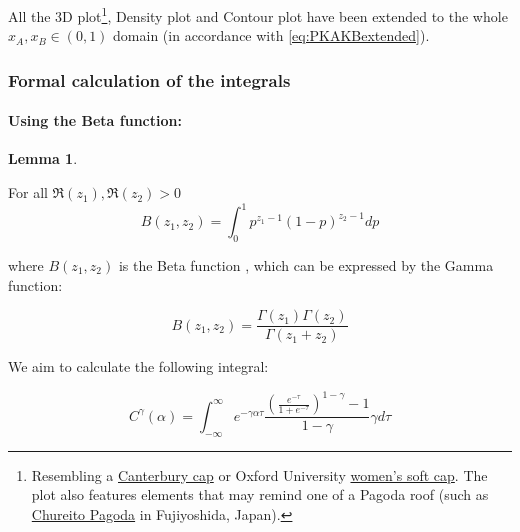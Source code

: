 \documentclass{article}
\theoremstyle{definition}
\newtheorem{lemma}{Lemma}[section]
\begin{document}
All the 3D plot\footnote{Resembling a \href{https://www.wippell.co.uk/Online-Shop/Clergy-Outffiting/Hats-\%281\%29/Style-250-Canterbury-Cap.aspx}{Canterbury cap} or Oxford University \href{https://www.museodelestudiante.com/Indumentaria_y_distintivos/SoftCapAA.htm}{women's soft cap}. The plot also features elements that may remind one of a Pagoda roof \cite{book:BuddhistArchitecture,book:JapaneseArchitecture} (such as \href{https://en.wikipedia.org/wiki/File:Chureito_Pagoda_and_Mount_Fuji.jpg}{Chureito Pagoda} in Fujiyoshida, Japan).}, Density plot and Contour plot have been extended to the whole $x_A,x_B \in (0,1)$ domain (in accordance with \eqref{eq:PKAKBextended}).


\subsubsection{Formal calculation of the integrals}
\label{sec:gammaGammaIntegrals}

\paragraph{Using the Beta function:}

\begin{lemma}
\label{lemma:BetaDef}

For all $\Re(z_1),\Re(z_2) > 0$
    \begin{equation}
        B(z_1,z_2) = \int_0^1 p^{z_1-1} (1-p)^{z_2-1} dp
    \end{equation}

    where $B(z_1,z_2)$ is the Beta function \cite{book:HigherTranscendentalFunctions, book:SeymourMathematicalHandbook, book:Bronshtein, book:NISThandbook, book:Abramowitz}, which can be expressed by the Gamma function:

    \begin{equation}
        B(z_1,z_2) = \frac{\Gamma(z_1) \Gamma(z_2)}{\Gamma(z_1+z_2)}
    \end{equation}
    
\end{lemma}

We aim to calculate the following integral:

\begin{equation}
    \label{eq:C(alpha)_gamma}
    C^\gamma(\alpha) = \int_{-\infty}^\infty e^{-\gamma \alpha \tau} 
    \frac{\left ( \frac{e^{-\tau}}{1 + e^{-\tau}} \right )^{1-\gamma}-1}{1-\gamma} 
    \gamma d \tau
\end{equation}
\end{document}
